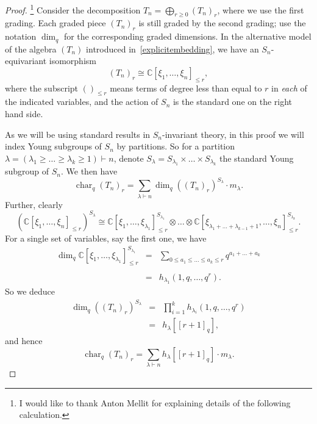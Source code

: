 \documentclass[a4paper,11pt]{amsart}
\theoremstyle{plain}
\theoremstyle{definition}
\newcommand{\C}{\mathbb{C}}
\DeclareMathOperator{\cha}{char}
\begin{document}
\begin{proof}\!\!\footnote{I would like to thank Anton Mellit for explaining details of the following calculation.} 
Consider the decomposition $T_n = \bigoplus_{r\geq 0} (T_n)_r$, where we use the first grading.  Each graded piece $(T_n)_r$ is still graded by the second grading; use the notation $\dim_q$ for the corresponding graded dimensions. In the alternative model of the algebra $(T_n)$ introduced in~\eqref{explicitembedding}, 
we have an $S_n$-equivariant isomorphism
\[(T_n)_r \cong \C[\xi_1, \ldots, \xi_n]_{\leq r},\]
where the subscript $()_{\leq r}$ means terms of degree less than equal to $r$ in {\em each} of the indicated variables, and the action of $S_n$ is the standard one on the right hand side. 

As we will be using standard results in $S_n$-invariant theory, in this proof we will index Young subgroups of $S_n$ by partitions. So for a partition $\lambda = (\lambda_1\geq \ldots \geq \lambda_k\geq 1)\vdash n$, denote 
$S_\lambda=S_{\lambda_1}\times \ldots \times S_{\lambda_k}$ the standard Young subgroup of $S_n$. We then have 
\[ \cha_{q} (T_n)_r  =  \displaystyle\sum_{\lambda\vdash n} \dim_q((T_n)_r)^{S_\lambda} \cdot  m_\lambda.
\]
Further, clearly
\[(\C[\xi_1, \ldots, \xi_n]_{\leq r})^{S_\lambda} \cong \C[\xi_1,\ldots, \xi_{\lambda_1}]_{\leq r}^{S_{\lambda_1}} \otimes \ldots \otimes \C[\xi_{\lambda_1+\ldots+\lambda_{k-1}+1},\ldots, \xi_{n}]_{\leq r}^{S_{\lambda_k}}.
\]
For a single set of variables, say the first one, we have 
\[\begin{array}{rcl}\dim_q \C[\xi_1,\ldots, \xi_{\lambda_1}]_{\leq r}^{S_{\lambda_1}} & = & \displaystyle\sum_{0\leq a_1\leq \ldots\leq a_k\leq r} q^{a_1+\ldots + a_k}\\ \\
& = & h_{\lambda_1}(1,q,\ldots, q^r).
\end{array}
\]
So we deduce
\[\begin{array}{rcl}
\dim_q((T_n)_r)^{S_\lambda} & = & \displaystyle\prod_{i=1}^k h_{\lambda_i}(1,q, \ldots, q^r) \\
& = & h_\lambda[[r+1]_q],
\end{array}
\]
and hence
\[ \cha_{q} (T_n)_r = \displaystyle\sum_{\lambda\vdash n} h_\lambda[[r+1]_q] \cdot m_\lambda.
\]
\end{proof}
\end{document}
